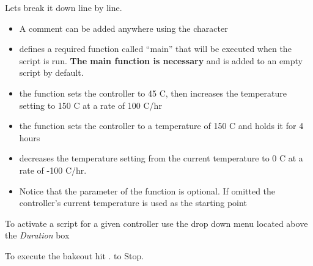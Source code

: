 \documentclass[letterpaper,10pt,english]{sphinxmanual}
\begin{document}
Lets break it down line by line.
\begin{itemize}
\item {} 
A comment can be added anywhere using the \code{\#} character

\item {} 
 defines a required function called ``main'' that will be executed when the script is run. \textbf{The main  function is necessary} and is added to an empty script by default.

\item {} 
the function    sets the controller to 45 C, then increases the temperature setting to 150 C at a rate of 100 C/hr

\item {} 
the function  sets the controller to a temperature of 150 C and holds it for 4 hours

\item {} 
 decreases the temperature setting from the current temperature to 0 C at a rate of -100 C/hr.

\item {} 
Notice that the  parameter of the {\hyperref[bakeout_scripting:ramp]{}} function is optional. If omitted the controller's current temperature is used as the starting point

\end{itemize}

To activate a script for a given controller use the drop down menu located above the \emph{Duration} box

To execute the bakeout hit .  to Stop.

\end{document}
